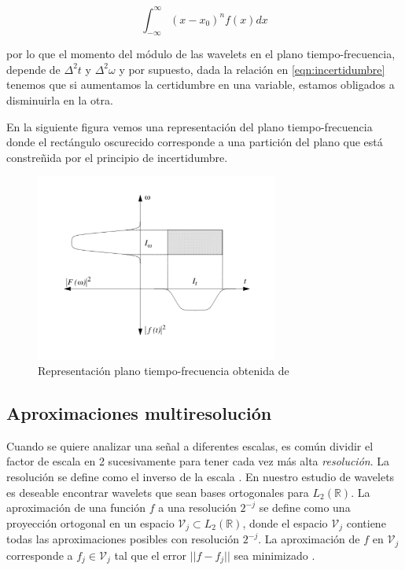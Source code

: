 \documentclass[conference]{IEEEtran}
\begin{document}
\begin{equation}
  \int_{-\infty}^\infty (x-x_0)^n f(x) dx
\end{equation}

por lo que el momento del módulo de las wavelets en el plano tiempo-frecuencia, depende de $\Delta^2 t$ y $\Delta^2 \omega$ y por supuesto, dada la relación en \eqref{eqn:incertidumbre} tenemos que si aumentamos la certidumbre en una variable, estamos obligados a disminuirla en la otra.


En la siguiente figura vemos una representación del plano tiempo-frecuencia donde el rectángulo oscurecido corresponde a una partición del plano que está constreñida por el principio de incertidumbre.

\begin{figure}[H]
\includegraphics[width=8cm]{images/tf.png}
\caption{Representación plano tiempo-frecuencia obtenida de    \cite{waveletsandsubbandcoding}}
\end{figure}




\subsection{Aproximaciones multiresolución}

Cuando se quiere analizar una señal a diferentes escalas, es común dividir el factor de escala en 2 sucesivamente para tener cada vez más alta \emph{resolución}. La resolución se define como el inverso de la escala   \cite{wavelettour}. En nuestro estudio de wavelets es deseable encontrar wavelets que sean bases ortogonales para $L_2(\mathds{R})$. La aproximación de una función $f$ a una resolución $2^{-j}$ se define como una proyección ortogonal en un espacio $\mathcal{V}_j \subset L_2(\mathds{R})$, donde el espacio $\mathcal{V}_j$ contiene todas las aproximaciones posibles con resolución $2^{-j}$. La aproximación de $f$ en $\mathcal{V}_j$ corresponde a $f_j \in \mathcal{V}_j$ tal que el error $||f-f_j||$ sea minimizado    \cite{wavelettour, waveletsandsubbandcoding}.
\end{document}
